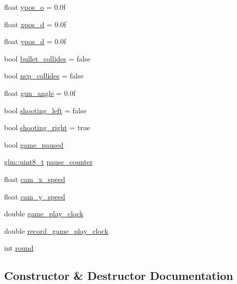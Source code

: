 \begin{DoxyCompactItemize}
float \hyperlink{classGamePlayState_a865a2610a83319f93d5333a3601df82f}{ypos\+\_\+o} = 0.\+0f
\item 
float \hyperlink{classGamePlayState_ae464f50b3921ada027f527e57cdcff14}{xpos\+\_\+d} = 0.\+0f
\item 
float \hyperlink{classGamePlayState_a467580f211160c869fb9adf6cf71d1d7}{ypos\+\_\+d} = 0.\+0f
\item 
bool \hyperlink{classGamePlayState_a136dd8a52d05f63db0736bf7f79285de}{bullet\+\_\+collides} = false
\item 
bool \hyperlink{classGamePlayState_ae5146d674744d3f43e8541330e8e79a7}{ncp\+\_\+collides} = false
\item 
float \hyperlink{classGamePlayState_aab6a3ae389a4c88378653ab8b60e1249}{gun\+\_\+angle} = 0.\+0f
\item 
bool \hyperlink{classGamePlayState_af38249e5d60c38ec0df14acb443b774e}{shooting\+\_\+left} = false
\item 
bool \hyperlink{classGamePlayState_a36d144ba7b2b86df108b38ae3ebc0bb4}{shooting\+\_\+right} = true
\item 
bool \hyperlink{classGamePlayState_ab71837cbc756f4ab41405020d7c52265}{game\+\_\+paused}
\item 
\hyperlink{stdint_8h_aba7bc1797add20fe3efdf37ced1182c5}{glm\+::uint8\+\_\+t} \hyperlink{classGamePlayState_a7b3ecd4c94a9f810f6372aa2351cdfff}{pause\+\_\+counter}
\item 
float \hyperlink{classGamePlayState_a21784ee93feda6ce47f4d7ff4f6e5dce}{cam\+\_\+x\+\_\+speed}
\item 
float \hyperlink{classGamePlayState_a467246a63617143e0dc3995d6295ff13}{cam\+\_\+y\+\_\+speed}
\item 
double \hyperlink{classGamePlayState_ad96f288884a885e83d91ad054f248b2c}{game\+\_\+play\+\_\+clock}
\item 
double \hyperlink{classGamePlayState_aa28678cf03641c876bed4d121206441e}{record\+\_\+game\+\_\+play\+\_\+clock}
\item 
int \hyperlink{classGamePlayState_ab1e93bf24e15fb0e0f213a6ae546bc53}{round}
\end{DoxyCompactItemize}


\subsection{Constructor \& Destructor Documentation}
\mbox{\label{classGamePlayState_ab20bfae56acce9a61770ec97a27ecd73}} 
